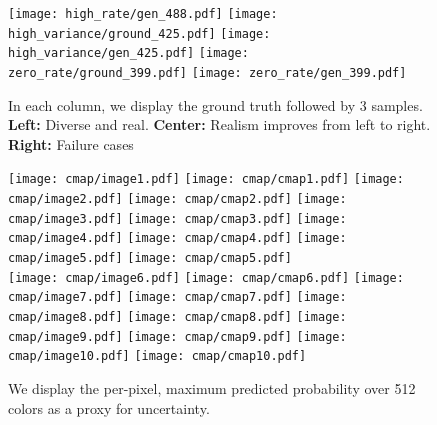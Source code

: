\documentclass{article} \usepackage{iclr2021_conference,times}
\begin{document}
\begin{figure}[htp]
  \texttt{[image: high\_rate/gen\_488.pdf]} \hfill
  \texttt{[image: high\_variance/ground\_425.pdf]}
  \texttt{[image: high\_variance/gen\_425.pdf]} \hfill
  \texttt{[image: zero\_rate/ground\_399.pdf]}
  \texttt{[image: zero\_rate/gen\_399.pdf]} \\
\caption{In each column, we display the ground truth followed by 3 samples. \textbf{Left:} Diverse and real. \textbf{Center:} Realism improves from left to right. \textbf{Right:} Failure cases}
\label{fig:mturk_v1}
\end{figure}

\begin{figure}[htp]
\centering
\setlength{\lineskip}{0pt}

  \texttt{[image: cmap/image1.pdf]}
  \texttt{[image: cmap/cmap1.pdf]}
  \texttt{[image: cmap/image2.pdf]}  
  \texttt{[image: cmap/cmap2.pdf]}
  \texttt{[image: cmap/image3.pdf]}  
  \texttt{[image: cmap/cmap3.pdf]}
  \texttt{[image: cmap/image4.pdf]}
  \texttt{[image: cmap/cmap4.pdf]}
 \texttt{[image: cmap/image5.pdf]}  
  \texttt{[image: cmap/cmap5.pdf]} \\
  \texttt{[image: cmap/image6.pdf]}
  \texttt{[image: cmap/cmap6.pdf]}
  \texttt{[image: cmap/image7.pdf]}  
  \texttt{[image: cmap/cmap7.pdf]}
  \texttt{[image: cmap/image8.pdf]}  
  \texttt{[image: cmap/cmap8.pdf]}
  \texttt{[image: cmap/image9.pdf]}
  \texttt{[image: cmap/cmap9.pdf]}
  \texttt{[image: cmap/image10.pdf]}
  \texttt{[image: cmap/cmap10.pdf]}
\caption{We display the per-pixel, maximum predicted probability over 512 colors as a proxy for uncertainty.}
\label{fig:cmap_aux}
\end{figure}
\end{document}
